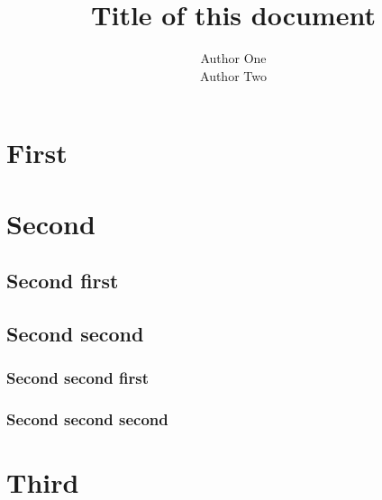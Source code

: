 \documentclass[11pt]{article}
\begin{document}
\title{Title of this document}
\author{Author One \\ Author Two}

\maketitle

\pagebreak
\tableofcontents

\pagebreak
{}

\pagebreak
\section{First}
\section{Second}
\subsection{Second first}
\subsection{Second second}
\subsubsection{Second second first}
\subsubsection{Second second second}
\section{Third}
\end{document}
